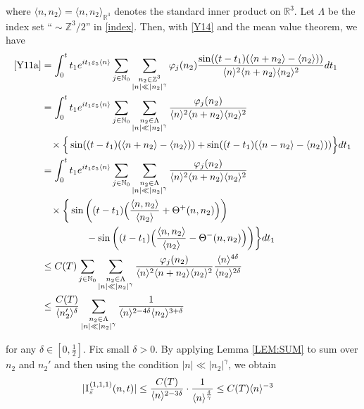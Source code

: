 \documentclass[%
11pt,  reqno]{amsart}
\newcommand{\1}{\hspace{0.2mm}\text{I}\hspace{0.2mm}}
\newcommand{\noi}{\noindent}
\newcommand{\Z}{\mathbb{Z}}
\newcommand{\R}{\mathbb{R}}
\newcommand{\dl}{\delta}
\newcommand{\eps}{\varepsilon}
\newcommand{\g}{\gamma}
\newcommand{\Ld}{\Lambda}
\newcommand{\jb}[1]
{\langle #1 \rangle}
\newcommand{\N}{\mathbb{N}}
\numberwithin{equation}{section}
\numberwithin{theorem}{section}
\begin{document}
\noi
where $\jb{n, n_2} = \jb{n, n_2}_{\R^3}$
denotes the standard inner product on $\R^3$.
Let $\Ld$ be the index set $\text{``}\sim \Z^3 / 2\text{''}$
in \eqref{index}.
Then, with \eqref{Y14} and the mean value theorem, we have
\begin{align}
\begin{split}
\eqref{Y11a} &
 =   
 \int_0^t  t_1  e^{ i t_1 \eps_5\jb{n}}
\sum_{j \in \N_0}
\sum_{\substack{n_2 \in \Z^3\\|n| \ll |n_2|^\g}}\varphi_j(n_2)
\frac{\sin ((t - t_1) (\jb{n+ n_2} - \jb{n_2}) )}{\jb{n}^2 \jb{n+n_2} \jb{n_2}^2 }
 dt_1\\
& =    \int_0^t  t_1  e^{ i t_1 \eps_5\jb{n}}
\sum_{j \in \N_0}
\sum_{\substack{n_2 \in \Ld\\|n| \ll |n_2|^\g}}\frac{\varphi_j(n_2)}
{\jb{n}^2 \jb{n+n_2} \jb{n_2}^2 }\\
& \hphantom{X}
\times
\Big\{ \sin ((t - t_1) (\jb{n+ n_2} - \jb{n_2}) )
+ \sin ((t - t_1) (\jb{n- n_2} - \jb{n_2}) )\Big\}
 dt_1\\
& =    \int_0^t  t_1  e^{ i t_1 \eps_5\jb{n}}
\sum_{j \in \N_0}
\sum_{\substack{n_2 \in \Ld\\|n| \ll |n_2|^\g}}\frac{\varphi_j(n_2)}{\jb{n}^2 \jb{n+n_2} \jb{n_2}^2 }\\
& \hphantom{X}
\times
   \bigg\{
\sin \bigg((t - t_1)\Big(  \frac{\jb{n, n_2}}{\jb{n_2}} + \Theta^+(n, n_2)\Big)\bigg) \\
& \hphantom{XXXXX}
- \sin \bigg((t - t_1)\Big(  \frac{\jb{n, n_2}}{\jb{n_2}} - \Theta^-(n, n_2)\Big)\bigg)
 \bigg\} dt_1
\\
 & \leq C(T) 
\sum_{j \in \N_0}
\sum_{\substack{n_2 \in \Ld\\|n| \ll |n_2|^\g}}\frac{\varphi_j(n_2)}{\jb{n}^2 \jb{n+n_2} \jb{n_2}^2 }
\frac{\jb{n}^{4\dl}}{\jb{n_2}^{2\dl}}\\
 & \leq \frac{C(T)}{\jb{n_2'}^{\dl}}
\sum_{\substack{n_2 \in \Ld\\|n| \ll |n_2|^\g}}\frac{1}{\jb{n}^{2-4\dl} \jb{n_2}^{3+\dl} }
\end{split}
\label{Y14a}
\end{align}

\noi
for any $\dl\in  [0, \frac 12]$.
Fix small $\dl > 0$. 
By applying  Lemma \ref{LEM:SUM} to sum over $n_2$
and $n_2'$
and then using the condition $|n| \ll |n_2|^\g$, we obtain
\begin{align*}
|\1^{(1,1,1)}_{\bar \eps} (n,t)|
& \le \frac{C(T)}{\jb{n}^{2-3\dl}} \cdot \frac{1}{\jb{n}^{\frac{\dl}{\g}}}
\le C(T){\jb{n}^{-3}}
\end{align*}
\end{document}

